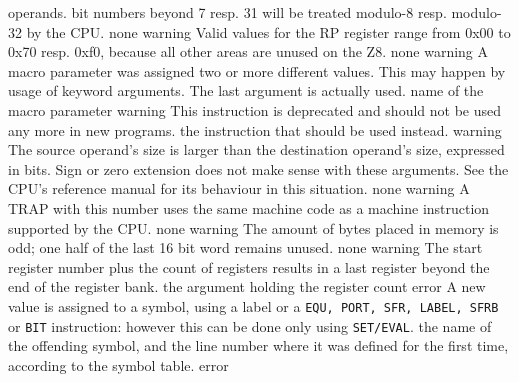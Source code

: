 \documentclass[12pt,twoside]{report}
\newcommand{\tty}[1]{{\tt #1}}
\begin{document}
\begin{description}
{                operands.  bit numbers beyond 7 resp. 31 will be treated
                modulo-8 resp. modulo-32 by the CPU.}
               {none}
               {warning}
               {Valid values for the RP register range from 0x00 to 0x70 resp.
                0xf0, because all other areas are unused on the Z8.}
               {none}
               {warning}
               {A macro parameter was assigned two or more
                different values.  This may happen by usage of
                keyword arguments.  The last argument is actually
                used.}
               {name of the macro parameter}
               {warning}
               {This instruction is deprecated and should not be used any
                more in new programs.}
               {the instruction that should be used instead.}
               {warning}
               {The source operand's size is larger than the destination operand's
                size, expressed in bits.  Sign or zero extension does not make sense
                with these arguments.  See the CPU's reference manual for its behaviour
                in this situation.}
               {none}
               {warning}
               {A TRAP with this number uses the same machine code as a 
                machine instruction supported by the CPU.}
               {none}
               {warning}
               {The amount of bytes placed in memory is odd; one half of the last
                16 bit word remains unused.}
               {none}
               {warning}
               {The start register number plus the count of registers results
                in a last register beyond the end of the register bank.}
               {the argument holding the register count}
               {error}
               {A new value is assigned to a symbol, using a label or a
                \tty{EQU, PORT, SFR, LABEL, SFRB} or \tty{BIT} instruction: however this
                can be done only using \tty{SET/EVAL}.}
               {the name of the offending symbol, and the line number where
                it was defined for the first time, according to the symbol
                table.}
               {error}

\end{description}
\end{document}
